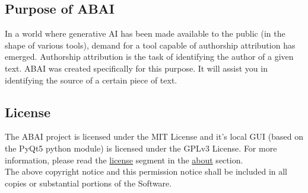 \subsection{Purpose of ABAI}
In a world where generative AI has been made available to the public (in the shape of various tools), demand for a tool capable of authorship attribution has emerged. Authorship attribution is the task of identifying the author of a given text. ABAI was created specifically for this purpose. It will assist you in identifying the source of a certain piece of text.

\subsection{License}
The ABAI project is licensed under the MIT License and it's local GUI (based on the PyQt5 python module) is licensed under the GPLv3 License. For more information, please read the \hyperref[subsec:License]{license} segment in the \hyperref[sec:About]{about} section.\\

The above copyright notice and this permission notice shall be included in all
copies or substantial portions of the Software.